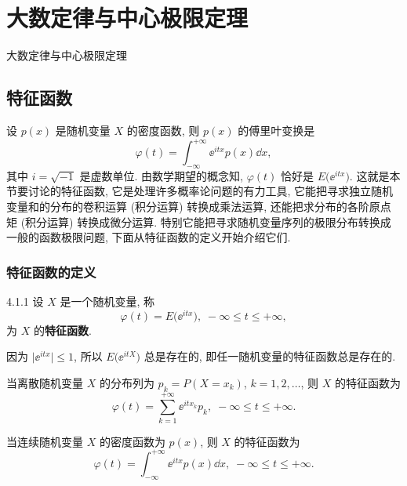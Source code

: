 
\chapter{大数定律与中心极限定理}
大数定律与中心极限定理

\section{特征函数}

设 $ p (x) $ 是随机变量 $ X $ 的密度函数,
则 $ p (x) $ 的傅里叶变换是
\begin{equation*}
    \varphi (t) = \int_{-\infty}^{+\infty} \ee^{itx} p (x) \dd x,
\end{equation*}
其中 $ i = \sqrt{-1} $ 是虚数单位.
由数学期望的概念知,
$ \varphi (t) $ 恰好是 $ E \bigl( \ee^{itx} \bigr) $.
这就是本节要讨论的特征函数,
它是处理许多概率论问题的有力工具,
它能把寻求独立随机变量和的分布的卷积运算 (积分运算) 转换成乘法运算,
还能把求分布的各阶原点矩 (积分运算) 转换成微分运算.
特别它能把寻求随机变量序列的极限分布转换成一般的函数极限问题,
下面从特征函数的定义开始介绍它们.

\subsection{特征函数的定义}

\begin{definition}{}{4.1.1}
    设 $ X $ 是一个随机变量,
    称
    \begin{equation}\label{eq:4.1.1}
        \varphi (t) = E \bigl( \ee^{itx} \bigr), \; -\infty \leq t \leq +\infty,
    \end{equation}
    为 $ X $ 的\textbf{特征函数}.
\end{definition}

因为 $ \lvert \ee^{itx} \rvert \leq 1 $,
所以 $ E \bigl( \ee^{itX} \bigr) $ 总是存在的,
即任一随机变量的特征函数总是存在的.

当离散随机变量 $ X $ 的分布列为 $ p_k = P ( X = x_k ) $, $ k = 1,2,\dotsc $,
则 $ X $ 的特征函数为
\begin{equation}\label{eq:4.1.2}
    \varphi (t) = \sum_{k=1}^{+\infty} \ee^{itx_k} p_k, \; -\infty \leq t \leq +\infty.
\end{equation}

当连续随机变量 $ X $ 的密度函数为 $ p (x) $,
则 $ X $ 的特征函数为
\begin{equation}\label{eq:4.1.3}
    \varphi (t) = \int_{-\infty}^{+\infty} \ee^{itx} p (x) \dd x, \; -\infty \leq t \leq +\infty.
\end{equation}

